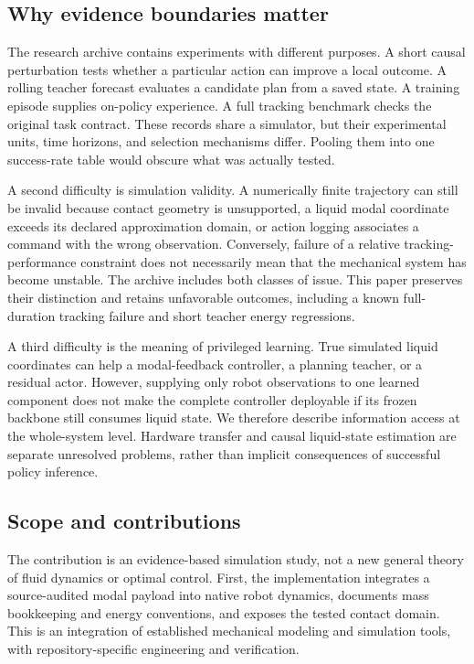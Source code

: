 \subsection{Why evidence boundaries matter}
The research archive contains experiments with different purposes. A short causal perturbation tests whether a particular action can improve a local outcome. A rolling teacher forecast evaluates a candidate plan from a saved state. A training episode supplies on-policy experience. A full tracking benchmark checks the original task contract. These records share a simulator, but their experimental units, time horizons, and selection mechanisms differ. Pooling them into one success-rate table would obscure what was actually tested.

A second difficulty is simulation validity. A numerically finite trajectory can still be invalid because contact geometry is unsupported, a liquid modal coordinate exceeds its declared approximation domain, or action logging associates a command with the wrong observation. Conversely, failure of a relative tracking-performance constraint does not necessarily mean that the mechanical system has become unstable. The archive includes both classes of issue. This paper preserves their distinction and retains unfavorable outcomes, including a known full-duration tracking failure and short teacher energy regressions.

A third difficulty is the meaning of privileged learning. True simulated liquid coordinates can help a modal-feedback controller, a planning teacher, or a residual actor. However, supplying only robot observations to one learned component does not make the complete controller deployable if its frozen backbone still consumes liquid state. We therefore describe information access at the whole-system level. Hardware transfer and causal liquid-state estimation are separate unresolved problems, rather than implicit consequences of successful policy inference.

\subsection{Scope and contributions}
The contribution is an evidence-based simulation study, not a new general theory of fluid dynamics or optimal control. First, the implementation integrates a source-audited modal payload into native robot dynamics, documents mass bookkeeping and energy conventions, and exposes the tested contact domain. This is an integration of established mechanical modeling and simulation tools, with repository-specific engineering and verification.

